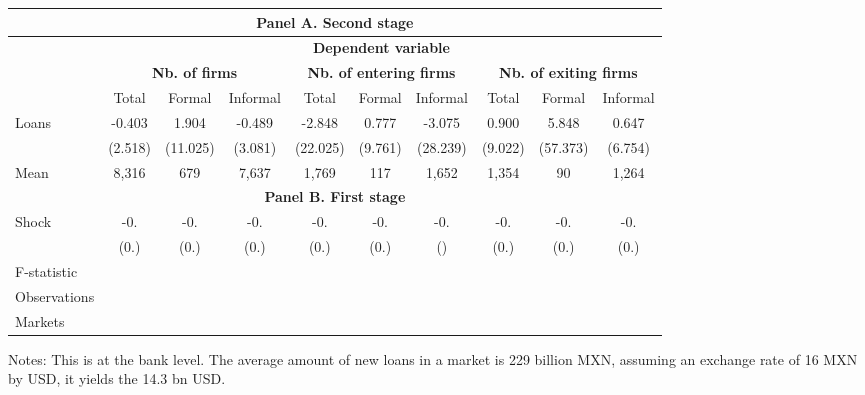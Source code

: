 \centering
\begin{threeparttable}
\begin{tabular}{lccccccccc}
\toprule
\multicolumn{10}{c}{\textbf{Panel A. Second stage}} \\
\midrule
& \multicolumn{9}{c}{\textbf{Dependent variable}} \\
\cmidrule(lr){2-10}
 & \multicolumn{3}{c}{\textbf{Nb. of firms}} & \multicolumn{3}{|c|}{\textbf{Nb. of entering firms}} & \multicolumn{3}{c}{\textbf{Nb. of exiting firms}} \\
\cmidrule(lr){2-10}
& Total 
& Formal 
& \multicolumn{1}{c|}{Informal}
& Total 
& Formal 
& \multicolumn{1}{c|}{Informal}
& Total 
& Formal 
& Informal \\
\midrule
Loans 
&  -0.403  & 1.904  & -0.489   &  -2.848  & 0.777   & -3.075  & 0.900   & 5.848   & 0.647 \\
& (2.518) & (11.025) & (3.081) & (22.025) & (9.761) & (28.239) & (9.022) & (57.373) & (6.754) \\
\midrule
Mean & 8,316 & 679 & 7,637 & 1,769 & 117 & 1,652 & 1,354 & 90 & 1,264 \\
\midrule
\multicolumn{10}{c}{\textbf{Panel B. First stage}} \\
\midrule
Shock & -0. & -0. & -0. & -0. & -0. & -0. & -0. & -0. & -0. \\
& (0.) & (0.) & (0.) & (0.) & (0.) & () & (0.) & (0.) & (0.) \\
F-statistic &  &  &  &  &  &  &  &  &  \\
Observations &  &  &  &  &  &  &  &  &  \\
Markets &  &  &  &  &  &  &  &  &  \\


\bottomrule
\end{tabular}
\begin{tablenotes}[flushleft]
\tiny
\item Notes: This is at the bank level. The average amount of new loans in a market is 229 billion MXN, assuming an exchange rate of 16 MXN by USD, it yields the 14.3 bn USD.
\end{tablenotes}
\end{threeparttable}
